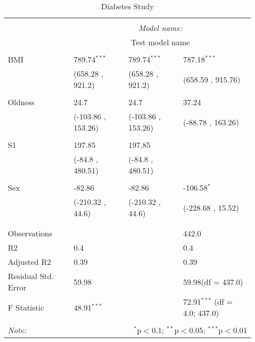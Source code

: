 \documentclass[12pt]{article}
\numberwithin{equation}{subsection}
\begin{document}
\begin{table}[!htbp] \centering
  \caption{Diabetes Study}
  \label{}
\begin{tabularx}{\textwidth}{lXXX}
\\[-1.8ex]\hline
\hline \\[-1.8ex]
& \multicolumn{3}{c}{\textit{Model name:}} \
\cr \cline{3-4}
\\[-1.8ex] & \multicolumn{3}{c}{Test model name} \\\hline \\[-1.8ex]
 BMI & 789.74$^{***}$ & 789.74$^{***}$ & 787.18$^{***}$ \\
  & (658.28 , 921.2) & (658.28 , 921.2) & (658.59 , 915.76) \\
  & & & \\
 Oldness & 24.7$^{}$ & 24.7$^{}$ & 37.24$^{}$ \\
  & (-103.86 , 153.26) & (-103.86 , 153.26) & (-88.78 , 163.26) \\
  & & & \\
 S1 & 197.85$^{}$ & 197.85$^{}$ & \\
  & (-84.8 , 480.51) & (-84.8 , 480.51) & \\
  & & & \\
 Sex & -82.86$^{}$ & -82.86$^{}$ & -106.58$^{*}$ \\
  & (-210.32 , 44.6) & (-210.32 , 44.6) & (-228.68 , 15.52) \\
  & & & \\
\hline \\[-1.8ex]
 Observations &   &   & 442.0 \\
 R${2}$ & 0.4 &   & 0.4 \\
 Adjusted R${2}$ & 0.39 &   & 0.39 \\
 Residual Std. Error & 59.98 &   & 59.98(df = 437.0)  \\
 F Statistic & 48.91$^{***}$  &     & 72.91$^{***}$ (df = 4.0; 437.0) \\
\hline
\hline \\[-1.8ex]
\textit{Note:} & \multicolumn{3}{r}{$^{*}$p$<$0.1; $^{**}$p$<$0.05; $^{***}$p$<$0.01} \\
\end{tabularx}
\end{table}
 
\end{document}
